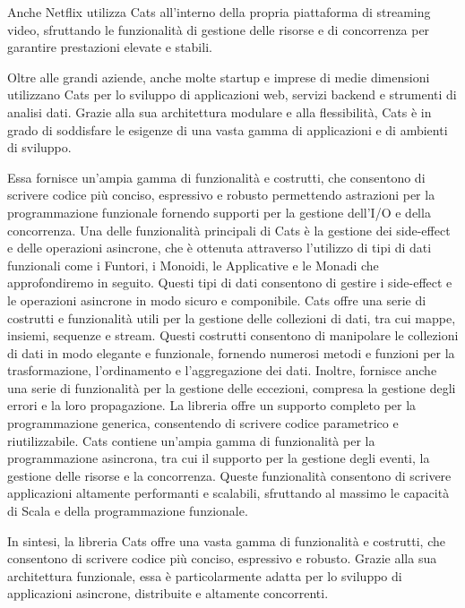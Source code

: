 \noindent Anche Netflix utilizza Cats all'interno della propria piattaforma di streaming video, sfruttando le funzionalità di gestione delle risorse e di concorrenza per garantire prestazioni elevate e stabili.

\noindent Oltre alle grandi aziende, anche molte startup e imprese di medie dimensioni utilizzano Cats per lo sviluppo di applicazioni web, servizi backend e strumenti di analisi dati. Grazie alla sua architettura modulare e alla flessibilità, Cats è in grado di soddisfare le esigenze di una vasta gamma di applicazioni e di ambienti di sviluppo.

\noindent Essa fornisce un'ampia gamma di funzionalità e costrutti, che consentono di scrivere codice più conciso, espressivo e robusto permettendo astrazioni per la programmazione funzionale fornendo supporti per la gestione dell'I/O e della concorrenza. Una delle funzionalità principali di Cats è la gestione dei side-effect e delle operazioni asincrone, che è ottenuta attraverso l'utilizzo di tipi di dati funzionali come i Funtori, i Monoidi, le Applicative e le Monadi che approfondiremo in seguito. Questi tipi di dati consentono di gestire i side-effect e le operazioni asincrone in modo sicuro e componibile. Cats offre una serie di costrutti e funzionalità utili per la gestione delle collezioni di dati, tra cui mappe, insiemi, sequenze e stream. Questi costrutti consentono di manipolare le collezioni di dati in modo elegante e funzionale, fornendo numerosi metodi e funzioni per la trasformazione, l'ordinamento e l'aggregazione dei dati. Inoltre, fornisce anche una serie di funzionalità per la gestione delle eccezioni, compresa la gestione degli errori e la loro propagazione. La libreria offre un supporto completo per la programmazione generica, consentendo di scrivere codice parametrico e riutilizzabile. Cats contiene un'ampia gamma di funzionalità per la programmazione asincrona, tra cui il supporto per la gestione degli eventi, la gestione delle risorse e la concorrenza. Queste funzionalità consentono di scrivere applicazioni altamente performanti e scalabili, sfruttando al massimo le capacità di Scala e della programmazione funzionale.

\noindent In sintesi, la libreria Cats offre una vasta gamma di funzionalità e costrutti, che consentono di scrivere codice più conciso, espressivo e robusto. Grazie alla sua architettura funzionale, essa è particolarmente adatta per lo sviluppo di applicazioni asincrone, distribuite e altamente concorrenti.

